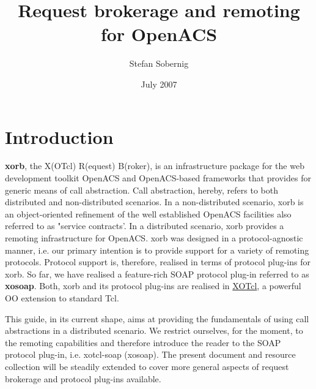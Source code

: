 

  
\title{Request brokerage and remoting for OpenACS}
\author{Stefan Sobernig}
\date{July 2007}
\maketitle
\renewcommand{\contentsname}{}
\tableofcontents 

     \section{Introduction}
        \textbf{xorb}, the X(OTcl) R(equest) B(roker), is an 
infrastructure package for the web development toolkit OpenACS and OpenACS-based frameworks that 
provides for generic means of call abstraction.  Call abstraction, hereby, refers to both distributed and 
non-distributed scenarios. In a non-distributed scenario, xorb is an object-oriented refinement of the well 
established OpenACS facilities also referred to as "service contracts'. In a distributed scenario, xorb 
provides a remoting infrastructure for OpenACS. xorb was designed in a protocol-agnostic manner, i.e. 
our primary intention is to provide support for a variety of remoting protocols. Protocol support is, 
therefore, realised in terms of protocol plug-ins for xorb. So far, we have realised a feature-rich SOAP 
protocol plug-in referred to as \textbf{xosoap}. Both, xorb and its protocol plug-ins are realised in \href{http://media.wu-wien.ac.at/}{XOTcl}, a powerful OO extension to standard Tcl.

This guide, in its current shape, aims at providing the fundamentals of using call abstractions in a 
distributed scenario. We restrict ourselves, for the moment, to the remoting capabilities and therefore 
introduce the reader to the SOAP protocol plug-in, i.e. xotcl-soap (xosoap). The present document and 
resource collection will be steadily extended to cover more general aspects of request brokerage and 
protocol plug-ins available.
